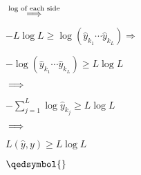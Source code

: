 \documentclass{article}
\begin{document}
\begin{latin}
$
\\ \\ \overset{\text{log of each side}}{\Longrightarrow} \\ \\
$
\begin{center}
$
-L \log L \ge \log \left( \hat{y}_{k_1}\cdots\hat{y}_{k_L} \right) \Longrightarrow
$
\end{center}
\begin{center}
$
-\log \left( \hat{y}_{k_1}\cdots\hat{y}_{k_L} \right) \ge L \log L 
$
\end{center}
$
\\ \\ \Longrightarrow
$
\begin{center}
$
-\sum_{j = 1}^{L} \log \hat{y}_{k_j} \ge L \log L
$
\end{center}
$
\\ \\ \Longrightarrow
$
\begin{center}
$
L\left( \hat{y}, y \right) \ge L \log L
$
\end{center}
$
\qedsymbol{}
$
\end{latin}

\newpage
\end{document}
